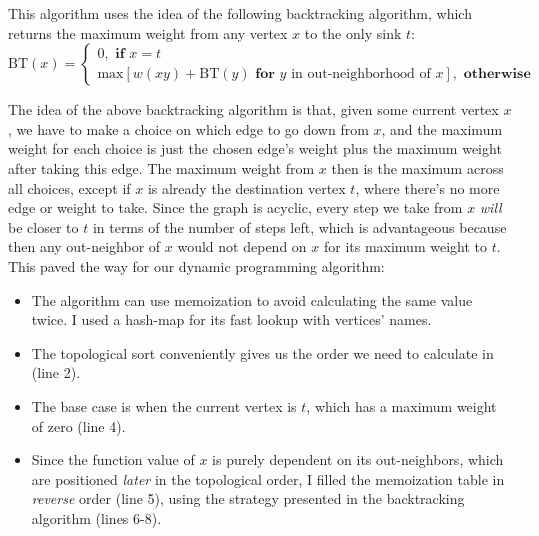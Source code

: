 \documentclass{article}
\begin{document}
\begin{enumerate}
\begin{center}
\begin{minipage}{\linewidth}
\begin{algorithm}[H]
{          
          }


        \end{algorithm}
      \end{minipage}
    \end{center}

    This algorithm uses the idea of the following backtracking algorithm, which returns the maximum weight from any vertex $x$ to the only sink $t$:
    $$
      \text{BT}(x) = \begin{cases}
        0,\textbf{ if }x = t \\
        \text{max}[w(xy) + \text{BT}(y)\textbf{ for }y\text{ in out-neighborhood of }x],\textbf{ otherwise}
      \end{cases}
    $$

    The idea of the above backtracking algorithm is that, given some current vertex $x$, we have to make a choice on which edge to go down from $x$, and the maximum weight for each choice is just the chosen edge's weight plus the maximum weight after taking this edge. The maximum weight from $x$ then is the maximum across all choices, except if $x$ is already the destination vertex $t$, where there's no more edge or weight to take. Since the graph is acyclic, every step we take from $x$ \textit{will} be closer to $t$ in terms of the number of steps left, which is advantageous because then any out-neighbor of $x$ would not depend on $x$ for its maximum weight to $t$. This paved the way for our dynamic programming algorithm:
    \begin{itemize}
      \item The algorithm can use memoization to avoid calculating the same value twice. I used a hash-map for its fast lookup with vertices' names.
      \item The topological sort conveniently gives us the order we need to calculate in (line 2).
      \item The base case is when the current vertex is $t$, which has a maximum weight of zero (line 4).
      \item Since the function value of $x$ is purely dependent on its out-neighbors, which are positioned \textit{later} in the topological order, I filled the memoization table in \textit{reverse} order (line 5), using the strategy presented in the backtracking algorithm (lines 6-8).
    \end{itemize}


\end{enumerate}
\end{document}

